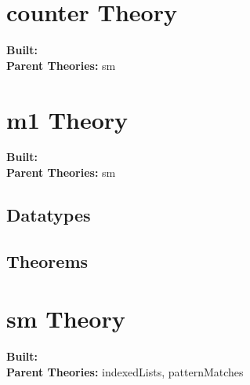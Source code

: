 \documentclass[11pt, twoside]{article}
\begin{document}




\tableofcontents
\cleardoublepage
\HOLpagestyle

\section{counter Theory}
\begin{flushleft}
\textbf{Built:} \HOLcounterDate \\[2pt]
\textbf{Parent Theories:} sm
\end{flushleft}




\section{m1 Theory}
\begin{flushleft}
\textbf{Built:} \HOLmOneDate \\[2pt]
\textbf{Parent Theories:} sm
\end{flushleft}

\subsection{Datatypes}

\HOLmOneDatatypes


\subsection{Theorems}

\HOLmOneTheorems

\section{sm Theory}
\begin{flushleft}
\textbf{Built:} \HOLsmDate \\[2pt]
\textbf{Parent Theories:} indexedLists, patternMatches
\end{flushleft}
\end{document}
